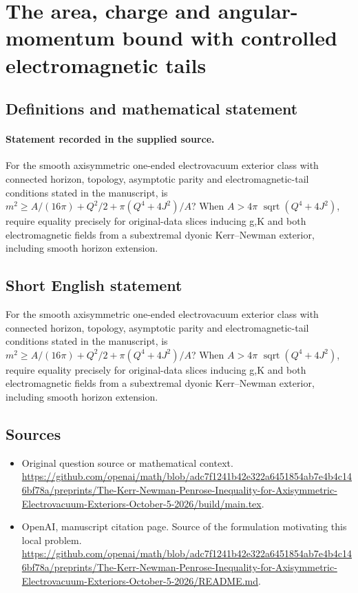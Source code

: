 \documentclass[11pt]{article}
\begin{document}
\section*{The area, charge and angular-momentum bound with controlled electromagnetic tails}\label{statement}
\subsection{Definitions and mathematical statement}
\paragraph{Statement recorded in the supplied source.}
For the smooth axisymmetric one-ended electrovacuum exterior class with connected horizon, topology, asymptotic parity and electromagnetic-tail conditions stated in the manuscript, is $m^2\geq A/(16\pi )+Q^2/2+\pi (Q^4+4J^2)/A$? When $A>4\pi $ $\operatorname{sqrt}(Q^4+4J^2)$, require equality precisely for original-data slices inducing g,K and both electromagnetic fields from a subextremal dyonic Kerr–Newman exterior, including smooth horizon extension.
\subsection{Short English statement}
For the smooth axisymmetric one-ended electrovacuum exterior class with connected horizon, topology, asymptotic parity and electromagnetic-tail conditions stated in the manuscript, is $m^2\geq A/(16\pi )+Q^2/2+\pi (Q^4+4J^2)/A$? When $A>4\pi $ $\operatorname{sqrt}(Q^4+4J^2)$, require equality precisely for original-data slices inducing g,K and both electromagnetic fields from a subextremal dyonic Kerr–Newman exterior, including smooth horizon extension.
\subsection{Sources}
\begin{itemize}
\item[S1] Original question source or mathematical context.
\url{https://github.com/openai/math/blob/adc7f1241b42e322a6451854ab7e4b4c146bf78a/preprints/The-Kerr-Newman-Penrose-Inequality-for-Axisymmetric-Electrovacuum-Exteriors-October-5-2026/build/main.tex}.
\item[S2] OpenAI, manuscript citation page. Source of the formulation motivating this local problem.
\url{https://github.com/openai/math/blob/adc7f1241b42e322a6451854ab7e4b4c146bf78a/preprints/The-Kerr-Newman-Penrose-Inequality-for-Axisymmetric-Electrovacuum-Exteriors-October-5-2026/README.md}.
\end{itemize}
\end{document}
